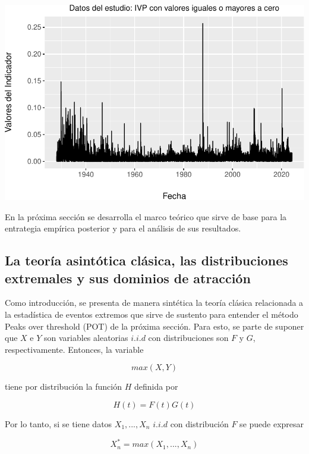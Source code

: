 \documentclass[
  12pt]{article}
\begin{document}
\includegraphics{Entrega_files/figure-latex/unnamed-chunk-18-1.pdf}

En la próxima sección se desarrolla el marco teórico que sirve de base
para la entrategia empírica posterior y para el análisis de sus
resultados.

\newpage

\subsection{La teoría asintótica clásica, las distribuciones extremales
y sus dominios de
atracción}\label{la-teoruxeda-asintuxf3tica-cluxe1sica-las-distribuciones-extremales-y-sus-dominios-de-atracciuxf3n}

Como introducción, se presenta de manera sintética la teoría clásica
relacionada a la estadística de eventos extremos que sirve de sustento
para entender el método Peaks over threshold (POT) de la próxima
sección. Para esto, se parte de suponer que \(X\) e \(Y\) son variables
aleatorias \(i.i.d\) con distribuciones son \(F\) y \(G\),
respectivamente. Entonces, la variable

\begin{equation}
max(X,Y)
\end{equation}

tiene por distribución la función \(H\) definida por

\begin{equation}
H(t)= F(t) G(t)
\end{equation}

Por lo tanto, si se tiene datos \(X_1,...,X_n\) \(i.i.d\) con
distribución \(F\) se puede expresar

\begin{equation}
X_n^* = max (X_1,...,X_n)
\end{equation}
\end{document}
